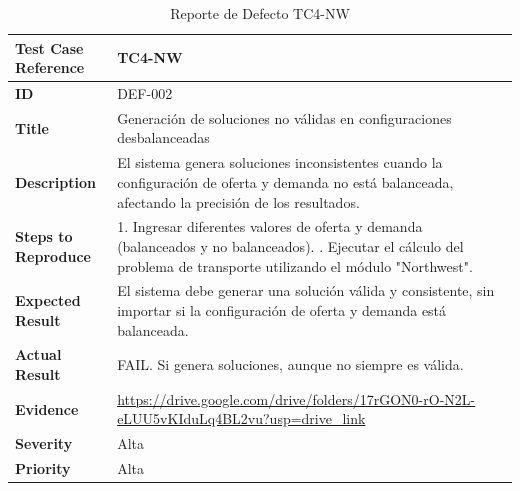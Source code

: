 \documentclass[stu, 12pt, letterpaper, donotrepeattitle, floatsintext, natbib]{apa7}
\begin{document}
\begin{longtable}{|p{5cm}|p{10cm}|}
    \caption{Reporte de Defecto TC4-NW} \label{tab:reporte_defecto_tc4} \\
    \hline
    \textbf{Test Case Reference} & TC4-NW \\ \hline
    \textbf{ID} & DEF-002 \\ \hline
    \textbf{Title} & Generación de soluciones no válidas en configuraciones desbalanceadas \\ \hline
    \textbf{Description} & El sistema genera soluciones inconsistentes cuando la configuración de oferta y demanda no está balanceada, afectando la precisión de los resultados. \\ \hline
    \textbf{Steps to Reproduce} & 
    1. Ingresar diferentes valores de oferta y demanda (balanceados y no balanceados). \newline
    2. Ejecutar el cálculo del problema de transporte utilizando el módulo "Northwest". \\ \hline
    \textbf{Expected Result} & El sistema debe generar una solución válida y consistente, sin importar si la configuración de oferta y demanda está balanceada. \\ \hline
    \textbf{Actual Result} & FAIL. Si genera soluciones, aunque no siempre es válida. \\ \hline
    \textbf{Evidence} & \url{https://drive.google.com/drive/folders/17rGON0-rO-N2L-eLUU5vKIduLq4BL2vu?usp=drive_link} \\ \hline
    \textbf{Severity} & Alta \\ \hline
    \textbf{Priority} & Alta \\ \hline
\end{longtable}
\end{document}
